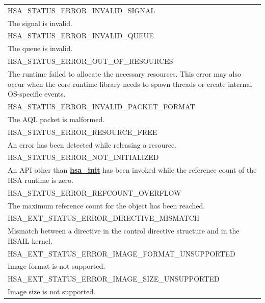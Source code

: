 \documentclass[final]{book}
\newcommand{\reffun}[1]{\textbf{#1}}
\newcommand{\reftyp}[1]{#1}
\newcommand{\refenu}[1]{\reftyp{#1}}
\begin{document}
\begin{longtable}{@{\hspace{2em}}p{\linewidth-2em}}
\hspace{-2em}\refenu{HSA_\-STATUS_\-ERROR_\-INVALID_\-SIGNAL}\\The signal is invalid.\\[2mm]
\hspace{-2em}\refenu{HSA_\-STATUS_\-ERROR_\-INVALID_\-QUEUE}\\The queue is invalid.\\[2mm]
\hspace{-2em}\refenu{HSA_\-STATUS_\-ERROR_\-OUT_\-OF_\-RESOURCES}\\The runtime failed to allocate the necessary resources. This error may also occur when the core runtime library needs to spawn threads or create internal OS-specific events.\\[2mm]
\hspace{-2em}\refenu{HSA_\-STATUS_\-ERROR_\-INVALID_\-PACKET_\-FORMAT}\\The AQL packet is malformed.\\[2mm]
\hspace{-2em}\refenu{HSA_\-STATUS_\-ERROR_\-RESOURCE_\-FREE}\\An error has been detected while releasing a resource.\\[2mm]
\hspace{-2em}\refenu{HSA_\-STATUS_\-ERROR_\-NOT_\-INITIALIZED}\\An API other than \hyperlink{group__initshutdown_1ga5b8574433e7dbcbd31ea397a02e3c32b}{\reffun{hsa_\-init}} has been invoked while the reference count of the HSA runtime is zero.\\[2mm]
\hspace{-2em}\refenu{HSA_\-STATUS_\-ERROR_\-REFCOUNT_\-OVERFLOW}\\The maximum reference count for the object has been reached.\\[2mm]
\hspace{-2em}\refenu{HSA_\-EXT_\-STATUS_\-ERROR_\-DIRECTIVE_\-MISMATCH}\\Mismatch between a directive in the control directive structure and in the HSAIL kernel.\\[2mm]
\hspace{-2em}\refenu{HSA_\-EXT_\-STATUS_\-ERROR_\-IMAGE_\-FORMAT_\-UNSUPPORTED}\\Image format is not supported.\\[2mm]
\hspace{-2em}\refenu{HSA_\-EXT_\-STATUS_\-ERROR_\-IMAGE_\-SIZE_\-UNSUPPORTED}\\Image size is not supported.
\end{longtable}
\end{document}
